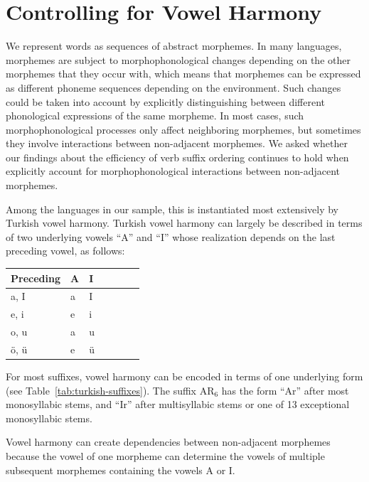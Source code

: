 \documentclass[11pt,letterpaper]{article}
\begin{document}
\section{Controlling for Vowel Harmony}\label{sec:vowel-harmony}


We represent words as sequences of abstract morphemes.
In many languages, morphemes are subject to morphophonological changes depending on the other morphemes that they occur with, which means that morphemes can be expressed as different phoneme sequences depending on the environment.
Such changes could be taken into account by explicitly distinguishing between different phonological expressions of the same morpheme.
In most cases, such morphophonological processes only affect neighboring morphemes, but sometimes they involve interactions between non-adjacent morphemes.
We asked whether our findings about the efficiency of verb suffix ordering continues to hold when explicitly account for morphophonological interactions between non-adjacent morphemes.

Among the languages in our sample, this is instantiated most extensively by Turkish vowel harmony.
Turkish vowel harmony can largely be described in terms of two underlying vowels ``A'' and ``I'' whose realization depends on the last preceding vowel, as follows:

\begin{center}
    \begin{tabular}{l|llllll}
        Preceding & A & I \\ \hline
        a, I & a & I \\
        e, i & e & i \\
        o, u & a & u \\
        {\"o}, {\"u} & e & {\"u}
    \end{tabular}
\end{center}

For most suffixes, vowel harmony can be encoded in terms of one underlying form (see Table~\ref{tab:turkish-suffixes}).
The suffix AR$_6$ has the form ``Ar'' after most monosyllabic stems, and ``Ir'' after multisyllabic stems or one of 13 exceptional monosyllabic stems.

Vowel harmony can create dependencies between non-adjacent morphemes because the vowel of one morpheme can determine the vowels of multiple subsequent morphemes containing the vowels A or I.
\end{document}
